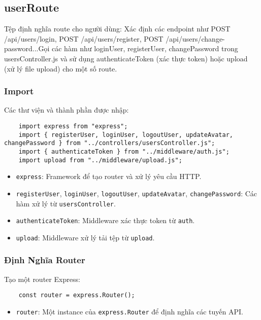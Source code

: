         \subsection{userRoute}
            \hspace*{0.6cm}Tệp định nghĩa route cho người dùng: Xác định các endpoint như POST /api/users/login, POST /api/users/register, POST /api/users/change-password...Gọi các hàm như loginUser, registerUser, changePassword trong usersController.js và sử dụng authenticateToken (xác thực token) hoặc upload (xử lý file upload) cho một số route.
            \subsubsection{Import}
                \hspace*{0.6cm}Các thư viện và thành phần được nhập:
                \begin{lstlisting}
    import express from "express";
    import { registerUser, loginUser, logoutUser, updateAvatar, changePassword } from "../controllers/usersController.js";
    import { authenticateToken } from "../middleware/auth.js";
    import upload from "../middleware/upload.js";
                \end{lstlisting}
                \begin{itemize}
                    \item \texttt{express}: Framework để tạo router và xử lý yêu cầu HTTP.
                    \item \texttt{registerUser}, \texttt{loginUser}, \texttt{logoutUser}, \texttt{updateAvatar}, \texttt{changePassword}: Các hàm xử lý từ \texttt{usersController}.
                    \item \texttt{authenticateToken}: Middleware xác thực token từ \texttt{auth}.
                    \item \texttt{upload}: Middleware xử lý tải tệp từ \texttt{upload}.
                \end{itemize}

            \subsubsection{Định Nghĩa Router}
                \hspace*{0.6cm}Tạo một router Express:
                \begin{lstlisting}
    const router = express.Router();
                \end{lstlisting}
                \begin{itemize}
                    \item \texttt{router}: Một instance của \texttt{express.Router} để định nghĩa các tuyến API.
                \end{itemize}

